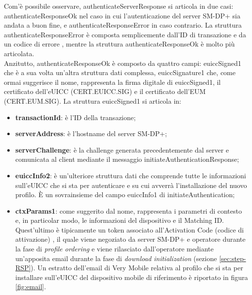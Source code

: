 \documentclass[10pt, oneside]{book}
\begin{document}
\noindent Com'è possibile osservare, authenticateServerResponse si articola in due casi: authenticateResponseOk nel caso in cui l'autenticazione del server SM-DP+ sia andata a buon fine, e authenticateResponseError in caso contrario. La struttura authenticateResponseError è composta semplicemente dall'ID di transazione e da un codice di errore \cite{RSP-definitions}, mentre la struttura authenticateResponseOk è molto più articolata.\\
Anzitutto, authenticateResponseOk è composto da quattro campi: euiccSigned1 che è a sua volta un'altra struttura dati complessa, euiccSignature1 che, come ormai suggerisce il nome, rappresenta la firma digitale di euiccSigned1, il certificato dell'eUICC (CERT.EUICC.SIG) e il certificato dell'EUM (CERT.EUM.SIG). La struttura euiccSigned1 si articola in:
\begin{itemize}
\item \textbf{transactionId}: è l'ID della transazione;
\item \textbf{serverAddress}: è l'hostname del server SM-DP+;
\item \textbf{serverChallenge}: è la challenge generata precedentemente dal server e comunicata al client mediante il messaggio initiateAuthenticationResponse;
\item \textbf{euiccInfo2}: è un'ulteriore struttura dati che comprende tutte le informazioni sull'eUICC che si sta per autenticare e su cui avverrà l'installazione del nuovo profilo. È un sovrainsieme del campo euiccInfo1 di initiateAuthentication;
\item \textbf{ctxParams1}: come suggerito dal nome, rappresenta i parametri di contesto e, in particolar modo, le informazioni del dispositivo e il Matching ID. Quest'ultimo è tipicamente un token associato all'Activation Code (codice di attivazione) \cite{RSP-definitions}, il quale viene negoziato da server SM-DP+ e operatore durante la fase di \textit{profile ordering} e viene rilasciato dall'operatore mediante un'apposita email durante la fase di \textit{download initialization} (sezione \ref{sec:step-RSP}). Un estratto dell'email di Very Mobile relativa al profilo che si sta per installare sull'eUICC del dispositivo mobile di riferimento è riportato in figura \ref{fig:email}.
\end{itemize}
\end{document}
